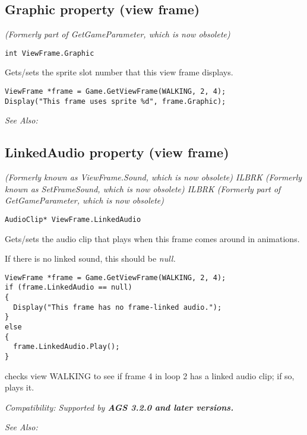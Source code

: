 \subsection{Graphic property (view frame)}\label{ViewFrame.Graphic}%

\it{(Formerly part of GetGameParameter, which is now obsolete)}

\begin{verbatim}
int ViewFrame.Graphic
\end{verbatim}
Gets/sets the sprite slot number that this view frame displays.

\begin{verbatim}
ViewFrame *frame = Game.GetViewFrame(WALKING, 2, 4);
Display("This frame uses sprite %d", frame.Graphic);
\end{verbatim}

\it{See Also:} 


\subsection{LinkedAudio property (view frame)}\label{ViewFrame.LinkedAudio}%

\it{(Formerly known as ViewFrame.Sound, which is now obsolete)} ILBRK
\it{(Formerly known as SetFrameSound, which is now obsolete)} ILBRK
\it{(Formerly part of GetGameParameter, which is now obsolete)}

\begin{verbatim}
AudioClip* ViewFrame.LinkedAudio
\end{verbatim}
Gets/sets the audio clip that plays when this frame comes around in animations.

If there is no linked sound, this should be \it{null}.

\begin{verbatim}
ViewFrame *frame = Game.GetViewFrame(WALKING, 2, 4);
if (frame.LinkedAudio == null)
{
  Display("This frame has no frame-linked audio.");
}
else
{
  frame.LinkedAudio.Play();
}
\end{verbatim}
checks view WALKING to see if frame 4 in loop 2 has a linked audio clip; if so, plays it.

\it{Compatibility:} Supported by \bf{AGS 3.2.0} and later versions.

\it{See Also:} 


